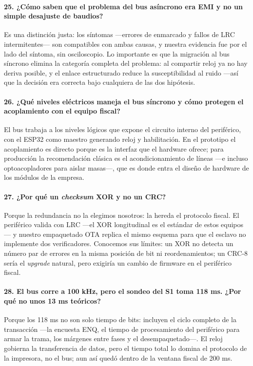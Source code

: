 \documentclass[11pt, a4paper]{article}
\begin{document}
\paragraph{25. ¿Cómo saben que el problema del bus asíncrono era EMI y no un simple desajuste de baudios?}
Es una distinción justa: los síntomas —errores de enmarcado y fallos de LRC intermitentes— son compatibles con ambas causas, y nuestra evidencia fue por el lado del síntoma, sin osciloscopio. Lo importante es que la migración al bus síncrono elimina la categoría completa del problema: al compartir reloj ya no hay deriva posible, y el enlace estructurado reduce la susceptibilidad al ruido —así que la decisión era correcta bajo cualquiera de las dos hipótesis.

\paragraph{26. ¿Qué niveles eléctricos maneja el bus síncrono y cómo protegen el acoplamiento con el equipo fiscal?}
El bus trabaja a los niveles lógicos que expone el circuito interno del periférico, con el ESP32 como maestro generando reloj y habilitación. En el prototipo el acoplamiento es directo porque es la interfaz que el hardware ofrece; para producción la recomendación clásica es el acondicionamiento de líneas —e incluso optoacopladores para aislar masas—, que es donde entra el diseño de hardware de los módulos de la empresa.

\paragraph{27. ¿Por qué un \textit{checksum} XOR y no un CRC?}
Porque la redundancia no la elegimos nosotros: la hereda el protocolo fiscal. El periférico valida con LRC —el XOR longitudinal es el estándar de estos equipos— y nuestro empaquetado OTA replica el mismo esquema para que el esclavo no implemente dos verificadores. Conocemos sus límites: un XOR no detecta un número par de errores en la misma posición de bit ni reordenamientos; un CRC-8 sería el \textit{upgrade} natural, pero exigiría un cambio de firmware en el periférico fiscal.

\paragraph{28. El bus corre a 100 kHz, pero el sondeo del S1 toma 118 ms. ¿Por qué no unos 13 ms teóricos?}
Porque los 118 ms no son solo tiempo de bits: incluyen el ciclo completo de la transacción —la encuesta ENQ, el tiempo de procesamiento del periférico para armar la trama, los márgenes entre fases y el desempaquetado—. El reloj gobierna la transferencia de datos, pero el tiempo total lo domina el protocolo de la impresora, no el bus; aun así quedó dentro de la ventana fiscal de 200 ms.
\end{document}
